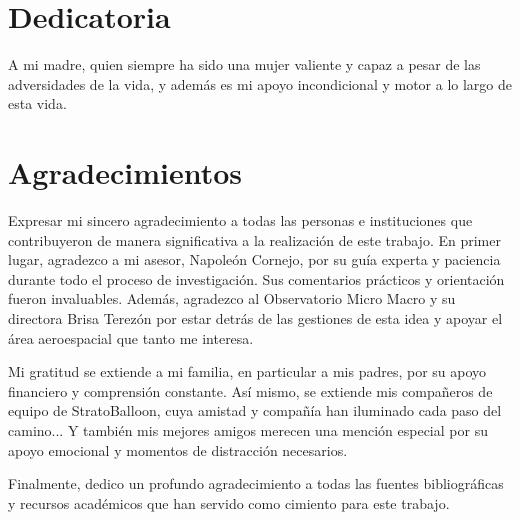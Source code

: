 \chapter*{Dedicatoria}

A mi madre, quien siempre ha sido una mujer valiente y capaz a pesar de las adversidades de la vida, y además es mi apoyo incondicional y motor a lo largo de esta vida.

\chapter*{Agradecimientos}

Expresar mi sincero agradecimiento a todas las personas e instituciones que contribuyeron de manera significativa a la realización de este trabajo. En primer lugar, agradezco a mi asesor, Napoleón Cornejo, por su guía experta y paciencia durante todo el proceso de investigación. Sus comentarios prácticos y orientación fueron invaluables. Además, agradezco al Observatorio Micro Macro y su directora Brisa Terezón por estar detrás de las gestiones de esta idea y apoyar el área aeroespacial que tanto me interesa. 

Mi gratitud se extiende a mi familia, en particular a mis padres, por su apoyo financiero y comprensión constante. Así mismo, se extiende mis compañeros de equipo de StratoBalloon, cuya amistad y compañía han iluminado cada paso del camino... Y también mis mejores amigos merecen una mención especial por su apoyo emocional y momentos de distracción necesarios.

Finalmente, dedico un profundo agradecimiento a todas las fuentes bibliográficas y recursos académicos que han servido como cimiento para este trabajo.

